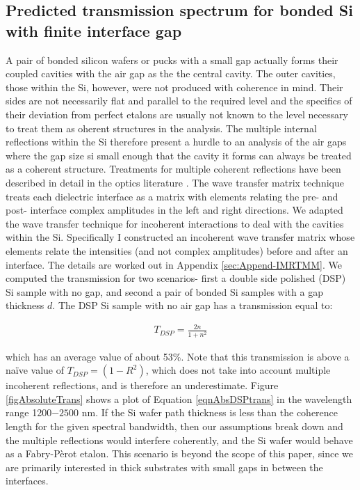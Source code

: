 \documentclass[osajnl,preprint,showpacs,superscriptaddress,12pt]{revtex4-1} %
\begin{document}
\subsection{Predicted transmission spectrum for bonded Si with finite interface gap}
\label{secTheory}
A pair of bonded silicon wafers or pucks with a small gap actually forms their coupled cavities with the air gap as the the central cavity.  The outer cavities, those within the Si, however, were not produced with coherence in mind.  Their sides are not necessarily flat and parallel to the required level and the specifics of their deviation from perfect etalons are usually not known to the level necessary to treat them as oherent structures in the analysis.  The multiple internal reflections within the Si therefore present a hurdle to an analysis of the air gaps where the gap size si small enough that the cavity it forms can always be treated as a coherent structure.  Treatments for multiple coherent reflections have been described in detail in the optics literature \cite{2007fuph.book.....S}.  The wave transfer matrix technique treats each dielectric interface as a matrix with elements relating the pre- and post- interface complex amplitudes in the left and right directions.  We adapted the wave transfer technique for incoherent interactions \cite{2002ApOpt..41.3978K} to deal with the cavities within the Si.  Specifically I constructed an incoherent wave transfer matrix whose elements relate the intensities (and not complex amplitudes) before and after an interface.  The details are worked out in Appendix \ref{sec:Append-IMRTMM}.  We computed the transmission for two scenarios- first a double side polished (DSP) Si sample with no gap, and second a pair of bonded Si samples with a gap thickness $d$.  The DSP Si sample with no air gap has a transmission equal to:

\begin{eqnarray}
T_{DSP} = \frac{2n}{1+n^2} \label{eqnAbsDSPtrans}
\end{eqnarray}

which has an average value of about 53\%.  Note that this transmission is above a na\"ive value of $T_{DSP}=(1-R^2)$, which does not take into account multiple incoherent reflections, and is therefore an underestimate.  Figure \ref{figAbsoluteTrans} shows a plot of Equation \ref{eqnAbsDSPtrans} in the wavelength range 1200$-2500$ nm.  If the Si wafer path thickness is less than the coherence length for the given spectral bandwidth, then our assumptions break down and the multiple reflections would interfere coherently, and the Si wafer would behave as a Fabry-P\`erot etalon.  This scenario is beyond the scope of this paper, since we are primarily interested in thick substrates with small gaps in between the interfaces.
\end{document}
